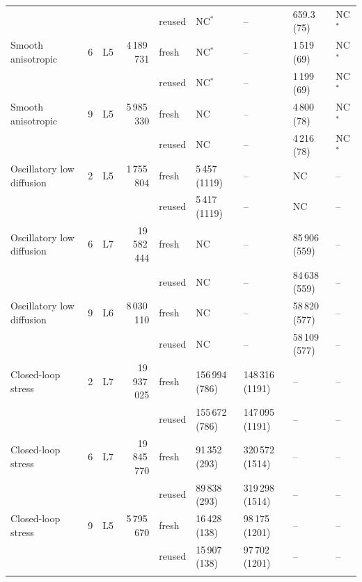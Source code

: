 \begin{tabular}{lrlrlllll}
 & & &  & reused & NC$^*$ & -- & 659.3 (75) & NC$^*$\\
\addlinespace[2pt]
Smooth anisotropic & 6 & L5 & 4\,189\,731 & fresh & NC$^*$ & -- & 1\,519 (69) & NC$^*$\\
 & & &  & reused & NC$^*$ & -- & 1\,199 (69) & NC$^*$\\
\addlinespace[2pt]
Smooth anisotropic & 9 & L5 & 5\,985\,330 & fresh & NC & -- & 4\,800 (78) & NC$^*$\\
 & & &  & reused & NC & -- & 4\,216 (78) & NC$^*$\\
\addlinespace[2pt]
Oscillatory low diffusion & 2 & L5 & 1\,755\,804 & fresh & 5\,457 (1119) & -- & NC & --\\
 & & &  & reused & 5\,417 (1119) & -- & NC & --\\
\addlinespace[2pt]
Oscillatory low diffusion & 6 & L7 & 19\,582\,444 & fresh & NC & -- & 85\,906 (559) & --\\
 & & &  & reused & NC & -- & 84\,638 (559) & --\\
\addlinespace[2pt]
Oscillatory low diffusion & 9 & L6 & 8\,030\,110 & fresh & NC & -- & 58\,820 (577) & --\\
 & & &  & reused & NC & -- & 58\,109 (577) & --\\
\addlinespace[2pt]
Closed-loop stress & 2 & L7 & 19\,937\,025 & fresh & 156\,994 (786) & 148\,316 (1191) & -- & --\\
 & & &  & reused & 155\,672 (786) & 147\,095 (1191) & -- & --\\
\addlinespace[2pt]
Closed-loop stress & 6 & L7 & 19\,845\,770 & fresh & 91\,352 (293) & 320\,572 (1514) & -- & --\\
 & & &  & reused & 89\,838 (293) & 319\,298 (1514) & -- & --\\
\addlinespace[2pt]
Closed-loop stress & 9 & L5 & 5\,795\,670 & fresh & 16\,428 (138) & 98\,175 (1201) & -- & --\\
 & & &  & reused & 15\,907 (138) & 97\,702 (1201) & -- & --\\
\addlinespace[2pt]
\bottomrule
\end{tabular}

